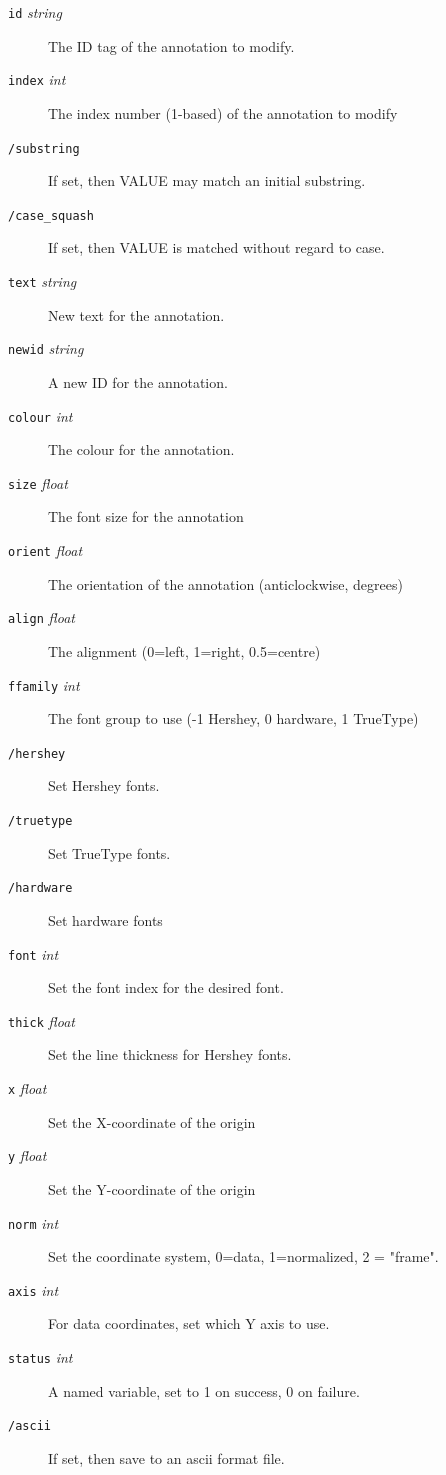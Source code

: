 \documentclass[11pt,twoside,english]{article}
\begin{document}
 \begin{description}
\item[\texttt{id} \textit{string}] The ID tag of the annotation to modify.
\item[\texttt{index} \textit{int}] The index number (1-based) of the annotation
		to modify
\item[\texttt{/substring}] If set, then VALUE may match an initial substring.
\item[\texttt{/case\_squash}] If set, then VALUE is matched without regard
		to case.
\item[\texttt{text} \textit{string}] New text for the annotation.
\item[\texttt{newid} \textit{string}] A new ID for the annotation.
\item[\texttt{colour} \textit{int}] The colour for the annotation.
\item[\texttt{size} \textit{float}] The font size for the annotation
\item[\texttt{orient} \textit{float}] The orientation of the annotation
		(anticlockwise, degrees)
\item[\texttt{align} \textit{float}] The alignment (0=left, 1=right, 0.5=centre)
\item[\texttt{ffamily} \textit{int}] The font group to use (-1 Hershey, 0 hardware,
		1 TrueType)
\item[\texttt{/hershey}] Set Hershey fonts.
\item[\texttt{/truetype}] Set TrueType fonts.
\item[\texttt{/hardware}] Set hardware fonts
\item[\texttt{font} \textit{int}] Set the font index for the desired font.
\item[\texttt{thick} \textit{float}] Set the line thickness for Hershey fonts.
\item[\texttt{x} \textit{float}] Set the X-coordinate of the origin
\item[\texttt{y} \textit{float}] Set the Y-coordinate of the origin
\item[\texttt{norm} \textit{int}] Set the coordinate system, 0=data,
		1=normalized, 2 = "frame".
\item[\texttt{axis} \textit{int}] For data coordinates, set which Y axis to use.
\item[\texttt{status} \textit{int}] A named variable, set to 1 on success, 0 on
		failure.
\item[\texttt{/ascii}] 	If set, then save to an ascii format file.
\end{description}
\end{document}

